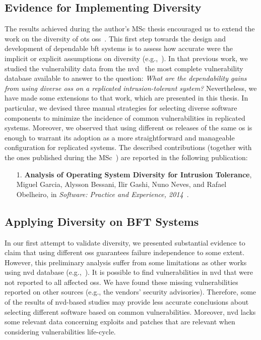 \subsection{Evidence for Implementing Diversity}%


The results achieved during the author's MSc thesis encouraged us to extend the work on the diversity of \gls{ots} \glspl{os}~\cite{Garcia:2012}.
This first step towards the design and development of dependable \gls{bft} systems is to assess how accurate were the implicit or explicit assumptions on diversity (e.g.,~\cite{Abd-El-Malek:2005,Bessani:2008,Castro:2002,Castro:2003,Clement:2009,Correia:2004,Kapitza:2012,Kotla:2010,Moniz:2011,Yin:2003}).
In that previous work, we studied the vulnerability data from the \gls{nvd}~\cite{nvd} the most complete vulnerability database available to answer to the question:
\emph{What are the dependability gains from using diverse \glspl{os} on a replicated  intrusion-tolerant system?} 
Nevertheless, we have made some extensions to that work, which are presented in this thesis.
In particular, we devised three manual strategies for selecting diverse software components to minimize the incidence of common vulnerabilities in replicated systems.
Moreover, we observed that using different \gls{os} releases of the same \gls{os} is enough to warrant its adoption as a more straightforward and manageable configuration for replicated systems.
The described contributions (together with the ones published during the MSc~\cite{Garcia:2012}) are reported in the following publication:

\begin{enumerate}
\item[1.] \textbf{Analysis of Operating System Diversity for Intrusion Tolerance}, Miguel Garcia, Alysson Bessani, Ilir Gashi, Nuno Neves, and Rafael Obelheiro, in \emph{Software: Practice and Experience, 2014}~\cite{Garcia:2014}.
\end{enumerate}



\subsection{Applying Diversity on BFT Systems}
In our first attempt to validate diversity, we presented substantial evidence to claim that using different \glspl{os} guarantees failure independence to some extent.
However, this preliminary analysis suffer from some limitations as other works using \gls{nvd} database (e.g.,~\cite{Han:2009,Frei:2010,Shahzad:2012,Bozorgi:2010,Allodi:2014,Gorbenko:2017}).
It is possible to find vulnerabilities in \gls{nvd} that were not reported to all affected \glspl{os}.
We have found these missing vulnerabilities reported on other sources (e.g., the vendors' security advisories).
Therefore, some of the results of \gls{nvd}-based studies may provide less accurate conclusions about selecting different software based on common vulnerabilities.
Moreover, \gls{nvd} lacks some relevant data concerning exploits and patches that are relevant when considering vulnerabilities life-cycle.

